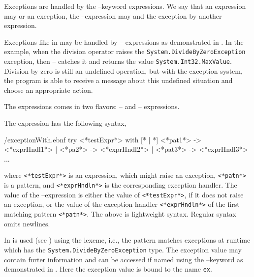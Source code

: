 Exceptions are handled by the --keyword expressions. We say that an expression may  or  an exception, the --expression may  and  the exception by another expression.

Exceptions like in  may be handled by -- expressions as demonstrated in .
%
%
In the example, when the division operator raises the \lstinline{System.DivideByZeroException} exception, then -- catches it and returns the value \lstinline{System.Int32.MaxValue}. Division by zero is still an undefined operation, but with the exception system, the program is able to receive a message about this undefined situation and choose an appropriate action.

The  expressions comes in two flavors: -- and -- expressions.

The  expression has the following syntax,
%
\begin{verbatimwrite}{\ebnf/exceptionWith.ebnf}
try
   <*testExpr*>
with
   [* | *] <*pat1*> -> <*exprHndl1*>
   | <*pa2*> -> <*exprHndl2*>
   | <*pat3*> -> <*exprHndl3*>
   ...
\end{verbatimwrite}
%
where \lstinline[language=syntax]{<*testExpr*>} is an expression, which might raise an exception, \lstinline[language=syntax]{<*patn*>} is a pattern, and \lstinline[language=syntax]{<*exprHndln*>} is the corresponding exception handler. The value of the --expression is either the value of \lstinline[language=syntax]{<*testExpr*>}, if it does not raise an exception, or the value of the exception handler \lstinline[language=syntax]{<*exprHndln*>} of the first matching pattern \lstinline[language=syntax]{<*patn*>}. The above is lightweight syntax. Regular syntax omits newlines.

In   is used (see ) using the  lexeme, i.e., the pattern matches exceptions at runtime which has the \lstinline{System.DivideByZeroException} type. The exception value may contain furter information and can be accessed if named using the --keyword as demonstrated in .
%
%
Here the exception value is bound to the name \lstinline{ex}.


